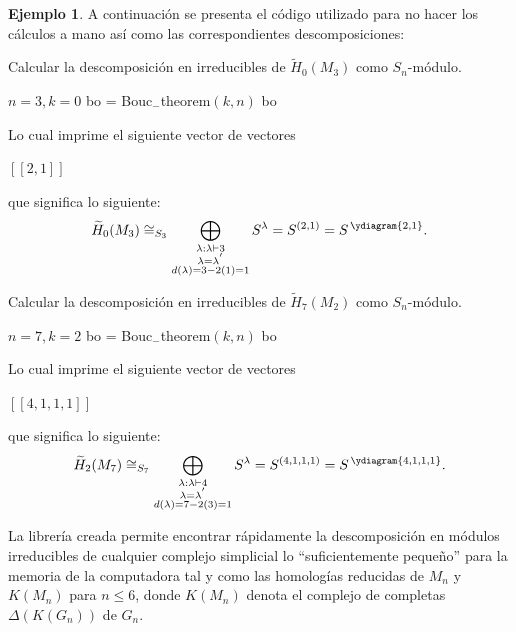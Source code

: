 \documentclass[12pt]{book}
\theoremstyle{definition}
\newtheorem{example}[theorem]{Ejemplo}
\newcounter{in}
\begin{document}
\begin{example}
  A continuación se presenta el código utilizado para no hacer los
  cálculos a mano así como las correspondientes descomposiciones:
  \quad
\begin{algorithm}[H]
\caption{Calcular la descomposición en irreducibles de $\widetilde H_{0}(M_3)$ como $S_n$-módulo.}
\begin{algorithmic}
\STATE $n = 3, k = 0$
\STATE bo = Bouc$_{-}$theorem$(k,n)$
\PRINT bo
\end{algorithmic}
\end{algorithm}  
Lo cual imprime el siguiente vector de vectores
\begin{center}
$\left [ \left [ 2,1 \right ] \right ]$ 
\end{center}
que significa lo siguiente:
  \begin{equation*}
    \widetilde H_{0}(M_{3})\cong_{S_{3}}\bigoplus_{\substack{\lambda:\lambda\vdash 3\\
        \lambda=\lambda^{'}\\d(\lambda)=3-2(1)=1}} S^{\lambda}=S^{(2,1)} = S^{\,\ydiagram{2,1}}.
  \end{equation*}
\begin{algorithm}[H]
\caption{Calcular la descomposición en irreducibles de $\widetilde H_{7}(M_2)$ como $S_n$-módulo.}
\begin{algorithmic}
\STATE $n = 7, k = 2$
\STATE bo = Bouc$_{-}$theorem$(k,n)$
\PRINT bo
\end{algorithmic}
\end{algorithm}  
Lo cual imprime el siguiente vector de vectores
\begin{center}
$\left [ \left [ 4,1,1,1 \right ] \right ]$ 
\end{center}
que significa lo siguiente:
  \begin{equation*}
    \widetilde H_{2}(M_{7})\cong_{S_{7}}\bigoplus_{\substack{\lambda:\lambda\vdash 4\\
        \lambda=\lambda^{'}\\d(\lambda)=7-2(3)=1}} S^{\lambda}=S^{(4,1,1,1)} = S^{\,\ydiagram{4,1,1,1}}.
  \end{equation*}
\end{example}
La librería creada permite encontrar
rápidamente la descomposición en módulos irreducibles de cualquier
complejo simplicial lo ``suficientemente pequeño'' para la memoria de
la computadora tal y como las homologías reducidas de $M_n$ y $K(M_n)$
para $n \leq 6$, donde $K(M_n)$ denota el complejo de completas
$\Delta(K(G_n))$ de $G_n$. 
\end{document}
